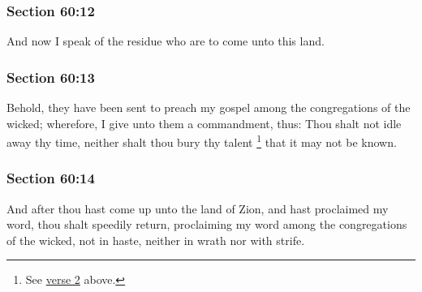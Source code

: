 	\subsubsection{Section 60:12} %
		\label{DC60-12}

		And now I speak of the residue who are to come unto this land.


	\subsubsection{Section 60:13} %
		\label{DC60-13}

		Behold, they have been sent to preach my gospel among the congregations of the wicked; wherefore, I give unto them a commandment, thus: Thou shalt not idle away thy time, neither shalt thou bury thy talent%
			\footnote{%
				See \hyperref[DC60-2]{verse 2} above.
				}
		that it may not be known.


	\subsubsection{Section 60:14} %
		\label{DC60-14}

		And after thou hast come up unto the land of Zion, and hast proclaimed my word, thou shalt speedily return, proclaiming my word among the congregations of the wicked, not in haste, neither in wrath nor with strife.


